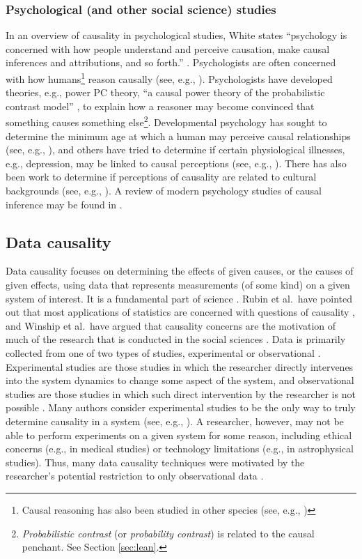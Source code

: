 \documentclass{article}[10pt]
\begin{document}
\subsubsection{Psychological (and other social science) studies} 
In an overview of causality in psychological studies, White states ``psychology is concerned with how people understand and perceive causation, make causal inferences and attributions, and so forth.'' \cite{White1990}.  Psychologists are often concerned with how humans\footnote{Causal reasoning has also been studied in other species (see, e.g., \cite{Sawa2009,Taylor2012})} reason causally (see, e.g., \cite{White1988,White1989,Shultz1982}).  Psychologists have developed theories, e.g., power PC theory, ``a causal power theory of the probabilistic contrast model'' \cite{Cheng1997}, to explain how a reasoner may become convinced that something causes something else\footnote{{\em Probabilistic contrast} (or {\em probability contrast}) is related to the causal penchant.  See Section \ref{sec:lean}.}.  Developmental psychology has sought to determine the minimum age at which a human may perceive causal relationships (see, e.g., \cite{Leslie1987,Oakes1990,Michotte1964}), and others have tried to determine if certain physiological illnesses, e.g., depression, may be linked to causal perceptions (see, e.g., \cite{Golin1981}).  There has also been work to determine if perceptions of causality are related to cultural backgrounds (see, e.g., \cite{Yan1994,Nguyen2004}).  A review of modern psychology studies of causal inference may be found in \cite{Sloman2015}.

\subsection{Data causality}
Data causality focuses on determining the effects of given causes, or the causes of given effects, using data that represents measurements (of some kind) on a given system of interest.  It is a fundamental part of science \cite{Godfrey2009}.  Rubin et al.\ have pointed out that most applications of statistics are concerned with questions of causality \cite{Imbens2015}, and Winship et al.\ have argued that causality concerns are the motivation of much of the research that is conducted in the social sciences \cite{Morgan2014}.  Data is primarily collected from one of two types of studies, experimental or observational \cite{Morgan2014}.  Experimental studies are those studies in which the researcher directly intervenes into the system dynamics to change some aspect of the system, and observational studies are those studies in which such direct intervention by the researcher is not possible \cite{Morgan2014,Imbens2015,Pearl2000}.  Many authors consider experimental studies to be the only way to truly determine causality in a system (see, e.g., \cite{Holland1986,Fisher1960}).  A researcher, however, may not be able to perform experiments on a given system for some reason, including ethical concerns (e.g., in medical studies) or technology limitations (e.g., in astrophysical studies).  Thus, many data causality techniques were motivated by the researcher's potential restriction to only observational data \cite{Pearl2000,Morgan2014,Imbens2015}.
\end{document}
